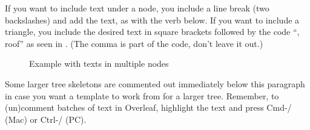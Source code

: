 \documentclass[output=paper,colorlinks,citecolor=brown,
]{langscibook}
\begin{document}
\noindent If you want to include text under a node, you include a line break (two backslashes) and add the text, as with the verb below. If you want to include a triangle, you include the desired text in square brackets followed by the code ``, roof'' as seen in . (The comma is part of the code, don't leave it out.)

\begin{figure}
\caption{Example with texts in multiple nodes}
  \label{fig:diercks:FullVpTree}
\end{figure}


\noindent Some larger tree skeletons are commented out immediately below this paragraph in case you want a template to work from for a larger tree. Remember, to (un)comment batches of text in Overleaf, highlight the text and press Cmd-/ (Mac) or Ctrl-/ (PC). 



\end{document}
